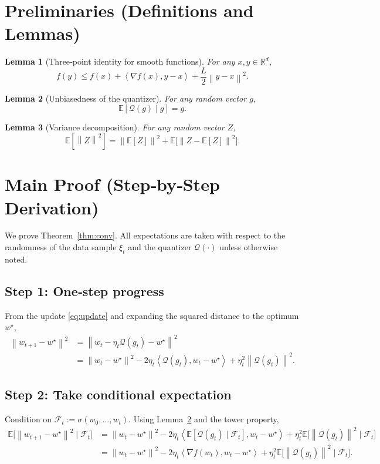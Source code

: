 \documentclass{article}
\newtheorem{lemma}{Lemma}
\newcommand{\E}{\mathbb{E}}
\newcommand{\R}{\mathbb{R}}
\newcommand{\norm}[1]{\left\| #1 \right\|}
\newcommand{\ip}[2]{\left\langle #1,#2 \right\rangle}
\newcommand{\Q}{\mathcal{Q}}
\begin{document}
\section*{Preliminaries (Definitions and Lemmas)}
\begin{lemma}[Three‑point identity for smooth functions]\label{lem:smooth}
For any $x,y\in\R^d$,
\[
f(y)\le f(x)+\ip{\nabla f(x)}{y-x}+\frac{L}{2}\norm{y-x}^2 .
\]
\end{lemma}
\begin{lemma}[Unbiasedness of the quantizer]\label{lem:unbiased}
For any random vector $g$,
\[
\E[\Q(g)\mid g]=g .
\]
\end{lemma}
\begin{lemma}[Variance decomposition]\label{lem:var}
For any random vector $Z$,
\[
\E[\norm{Z}^2]=\norm{\E[Z]}^2+\E\bigl[\norm{Z-\E[Z]}^2\bigr].
\]
\end{lemma}

\section*{Main Proof (Step‑by‑Step Derivation)}
We prove Theorem~\ref{thm:conv}.  
All expectations are taken with respect to the randomness of the data sample $\xi_t$ and the quantizer $\Q(\cdot)$ unless otherwise noted.

\subsection*{Step 1: One‑step progress}
From the update \eqref{eq:update} and expanding the squared distance to the optimum $w^\star$,
\begin{align}
\norm{w_{t+1}-w^\star}^2
&= \norm{w_t-\eta_t\Q(g_t)-w^\star}^2 \nonumber\\
&= \norm{w_t-w^\star}^2 -2\eta_t\ip{\Q(g_t)}{w_t-w^\star}
   +\eta_t^{2}\norm{\Q(g_t)}^{2}. \tag{Step 1}
\end{align}

\subsection*{Step 2: Take conditional expectation}
Condition on $\mathcal{F}_t:=\sigma(w_0,\dots,w_t)$.
Using Lemma~\ref{lem:unbiased} and the tower property,
\begin{align}
\E\bigl[ \norm{w_{t+1}-w^\star}^2 \mid \mathcal{F}_t \bigr]
&= \norm{w_t-w^\star}^2 
   -2\eta_t\ip{\E[\Q(g_t)\mid\mathcal{F}_t]}{w_t-w^\star}
   +\eta_t^{2}\E\!\bigl[\norm{\Q(g_t)}^{2}\mid\mathcal{F}_t \bigr] \nonumber\\
&= \norm{w_t-w^\star}^2 
   -2\eta_t\ip{ \nabla f(w_t)}{w_t-w^\star}
   +\eta_t^{2}\E\!\bigl[\norm{\Q(g_t)}^{2}\mid\mathcal{F}_t \bigr]. \tag{Step 2}
\end{align}
\end{document}
